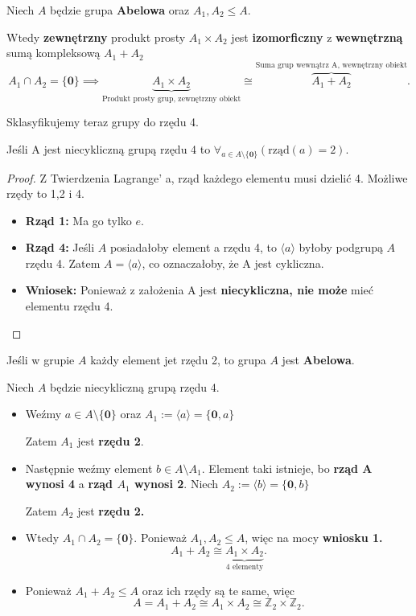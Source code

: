 \begin{corollary}

	Niech $A$ będzie grupa \textbf{Abelowa} oraz $A_1,A_2 \le A$.

	Wtedy \textbf{zewnętrzny} produkt prosty $A_1\times A_2$ jest \textbf{izomorficzny} z \textbf{wewnętrzną} sumą kompleksową $A_1 + A_2$
	\[
		A_1\cap A_2 = \{\mathbf{0}\} \implies \underbrace{A_1\times A_2}_{\text{Produkt prosty grup, zewnętrzny obiekt}} \cong \overbrace{A_1+A_2}^{\text{Suma grup wewnątrz A, wewnętrzny obiekt}}
	.\] 
\end{corollary}

\begin{goall} Sklasyfikujemy teraz grupy do rzędu 4.

	\begin{fact}
	Jeśli A jest niecykliczną grupą rzędu 4 to $\forall_{a\in A\setminus \{\mathbf{0}\} }\left( \text{rząd}(a)=2 \right)  $.
	\end{fact}
	\begin{proof}
	Z  Twierdzenia Lagrange' a, rząd każdego elementu musi dzielić 4. Możliwe rzędy to 1,2 i 4.
	\begin{itemize}
		\item \textbf{Rząd 1: } Ma go tylko $e$.
	\item \textbf{Rząd 4: }Jeśli $A$ posiadałoby element a rzędu 4, to $\langle a \rangle $ byłoby podgrupą $A$ rzędu 4. Zatem $A = \langle a \rangle$, co oznaczałoby, że A jest cykliczna.
	\item \textbf{Wniosek: } Ponieważ z założenia A jest \textbf{niecykliczna, nie może} mieć elementu rzędu 4. 
	\end{itemize}
	\end{proof}

	\begin{remark}
		Jeśli w grupie $A$ każdy element jet rzędu 2, to grupa $A$ jest \textbf{Abelowa}. 
	\end{remark}

	\noindent Niech $A$ będzie niecykliczną grupą rzędu 4. 
	\begin{itemize}
		\item  	Weźmy $a \in A\setminus \{\mathbf{0}\} $ oraz $ A_1 := \langle a \rangle = \{\mathbf{0}, a\} $ 
			
			Zatem $A_1$ jest \textbf{rzędu 2}.
		\item  Następnie weźmy element $b \in A\setminus A_1$. Element taki istnieje, bo \textbf{rząd A wynosi 4} a \textbf{rząd $A_1$ wynosi 2}. Niech $A_2 := \langle b \rangle = \{\mathbf{0},b\} $

			Zatem $A_2$ jest \textbf{rzędu 2.}
		\item Wtedy $A_1\cap A_2 = \{\mathbf{0}\}$. Ponieważ $A_1, A_2 \le  A$, więc na mocy \textbf{wniosku 1.}
			\[
			 A_1+A_2 \cong \underbrace{A_1\times A_2}_{\text{4 elementy}}
			.\] 
		\item 	Ponieważ $A_1+A_2\le A$ oraz ich rzędy są te same, więc
	\[
	A = A_1+A_2 \cong A_1\times A_2 \cong \mathbb{Z}_2 \times \mathbb{Z}_2
	.\] 
	\end{itemize}
\end{goall}

